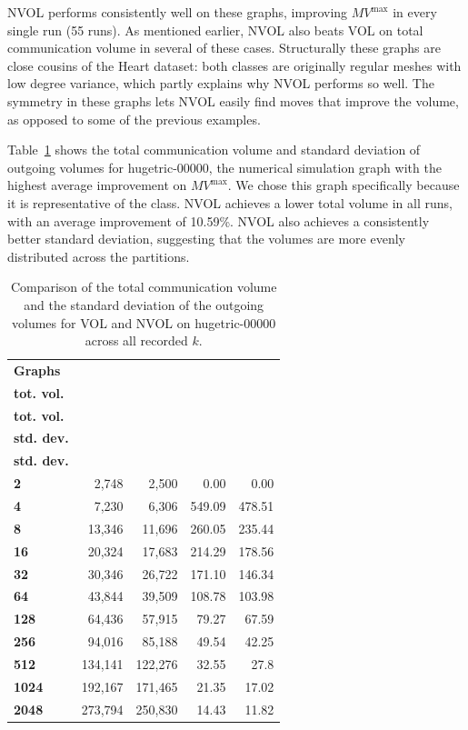 NVOL performs consistently well on these graphs, improving $MV^{\mathrm{max}}$ in every single run (55 runs). As mentioned earlier, NVOL also beats VOL on total communication volume in several of these cases. Structurally these graphs are close cousins of the Heart dataset: both classes are originally regular meshes with low degree variance, which partly explains why NVOL performs so well. The symmetry in these graphs lets NVOL easily find moves that improve the volume, as opposed to some of the previous examples. 

Table~\ref{tab:hugetric00000_comparison} shows the total communication volume and standard deviation of outgoing volumes for hugetric-00000, the numerical simulation graph with the highest average improvement on $MV^{\mathrm{max}}$. We chose this graph specifically because it is representative of the class. NVOL achieves a lower total volume in all runs, with an average improvement of 10.59\%. NVOL also achieves a consistently better standard deviation, suggesting that the volumes are more evenly distributed across the partitions.

\begin{table}[h]
	\centering
	\small
	\setlength{\tabcolsep}{3pt}
	\begin{tabular}{|l|r|r|r|r|}
		\hline
		\textbf{Graphs}
		& \makecell{\textbf{VOL}\\\textbf{tot. vol.}}
		& \makecell{\textbf{NVOL}\\\textbf{tot. vol.}}
		& \makecell{\textbf{VOL}\\\textbf{std. dev.}}
		& \makecell{\textbf{NVOL}\\\textbf{std. dev.}}\\
		\hline
		\textbf{2} & 2,748 & 2,500 & 0.00 & 0.00\\
		\hline
		\textbf{4} & 7,230 & 6,306 & 549.09 & 478.51\\
		\hline
		\textbf{8} & 13,346 & 11,696 & 260.05 & 235.44\\
		\hline
		\textbf{16} & 20,324 & 17,683 & 214.29 & 178.56\\
		\hline
		\textbf{32} & 30,346 & 26,722 & 171.10 & 146.34\\
		\hline
		\textbf{64} & 43,844 & 39,509 & 108.78 & 103.98\\
		\hline
		\textbf{128} & 64,436 & 57,915 & 79.27 & 67.59\\
		\hline
		\textbf{256} & 94,016 & 85,188 & 49.54 & 42.25\\
		\hline
		\textbf{512} & 134,141 & 122,276 & 32.55 & 27.8\\
		\hline
		\textbf{1024} & 192,167 & 171,465 & 21.35 & 17.02\\
		\hline
		\textbf{2048} & 273,794 & 250,830 & 14.43 & 11.82\\
		\hline
	\end{tabular}
	\caption{Comparison of the total communication volume and the standard deviation of the outgoing volumes for VOL and NVOL on hugetric-00000 across all recorded $k$.}
	\label{tab:hugetric00000_comparison}
\end{table}

